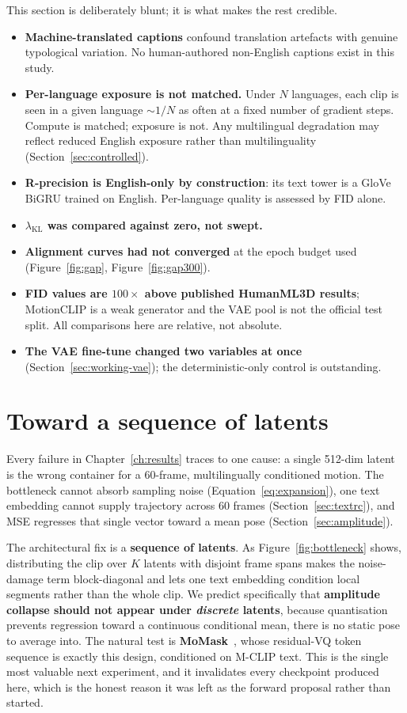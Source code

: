 \documentclass[11pt,a4paper]{report}
\newcommand{\lkl}{\ensuremath{\lambda_{\mathrm{KL}}}}
\begin{document}
This section is deliberately blunt; it is what makes the rest credible.

\begin{itemize}[leftmargin=*]
\item \textbf{Machine-translated captions} confound translation artefacts
 with genuine typological variation. No human-authored non-English
 captions exist in this study.
\item \textbf{Per-language exposure is not matched.} Under $N$ languages,
 each clip is seen in a given language ${\sim}1/N$ as often at a fixed
 number of gradient steps. Compute is matched; exposure is not. Any
 multilingual degradation may reflect reduced English exposure rather than
 multilinguality (Section~\ref{sec:controlled}).
\item \textbf{R-precision is English-only by construction}: its text
 tower is a GloVe BiGRU trained on English. Per-language quality is
 assessed by FID alone.
\item \textbf{\lkl{} was compared against zero, not swept.}
\item \textbf{Alignment curves had not converged} at the epoch budget used
 (Figure~\ref{fig:gap}, Figure~\ref{fig:gap300}).
\item \textbf{FID values are $100\times$ above published HumanML3D
 results}; MotionCLIP is a weak generator and the VAE pool is not the
 official test split. All comparisons here are relative, not absolute.
\item \textbf{The VAE fine-tune changed two variables at once}
 (Section~\ref{sec:working-vae}); the deterministic-only control is
 outstanding.
\end{itemize}

\section{Toward a sequence of latents}
\label{sec:forward}

Every failure in Chapter~\ref{ch:results} traces to one cause: a single
512-dim latent is the wrong container for a 60-frame, multilingually
conditioned motion. The bottleneck cannot absorb sampling noise
(Equation~\ref{eq:expansion}), one text embedding cannot supply trajectory
across 60 frames (Section~\ref{sec:textrc}), and MSE regresses that single
vector toward a mean pose (Section~\ref{sec:amplitude}).

The architectural fix is a \textbf{sequence of latents}. As
Figure~\ref{fig:bottleneck} shows, distributing the clip over $K$ latents
with disjoint frame spans makes the noise-damage term block-diagonal and
lets one text embedding condition local segments rather than the whole
clip. We predict specifically that \textbf{amplitude collapse should not
appear under \emph{discrete} latents}, because quantisation prevents
regression toward a continuous conditional mean, there is no static pose
to average into. The natural test is \textbf{MoMask}~\cite{guo2024momask},
whose residual-VQ token sequence is exactly this design, conditioned on
M-CLIP text. This is the single most valuable next experiment, and it
invalidates every checkpoint produced here, which is the honest reason it
was left as the forward proposal rather than started.
\end{document}
